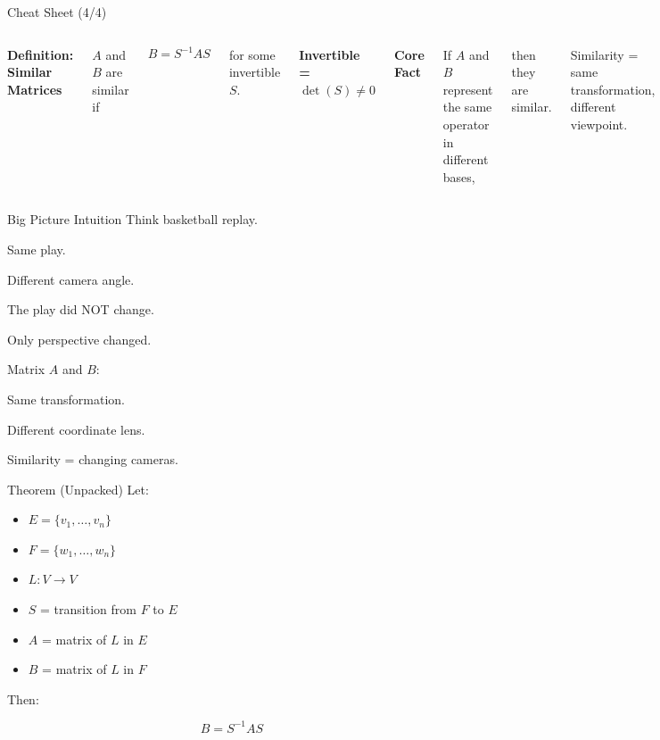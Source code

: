 \documentclass[landscape]{beamer}
\begin{document}
\begin{frame}{Cheat Sheet (4/4)}
\begin{columns}

\textbf{Definition: Similar Matrices}

$A$ and $B$ are similar if

\[
B = S^{-1} A S
\]

for some invertible $S$.

\textbf{Invertible =}
$\det(S) \neq 0$


\textbf{Core Fact}

If $A$ and $B$ represent
the same operator
in different bases,

then they are similar.

Similarity = same transformation,
different viewpoint.

\end{columns}
\end{frame}

\begin{frame}{Big Picture Intuition}
Think basketball replay.

Same play.

Different camera angle.

The play did NOT change.

Only perspective changed.

Matrix $A$ and $B$:

Same transformation.

Different coordinate lens.

Similarity = changing cameras.
\end{frame}

\begin{frame}{Theorem (Unpacked)}
Let:

\begin{itemize}
\item $E=\{v_1,\dots,v_n\}$
\item $F=\{w_1,\dots,w_n\}$
\item $L:V\to V$
\item $S$ = transition from $F$ to $E$
\item $A$ = matrix of $L$ in $E$
\item $B$ = matrix of $L$ in $F$
\end{itemize}

Then:

\[
B = S^{-1}AS
\]

\end{frame}
\end{document}
